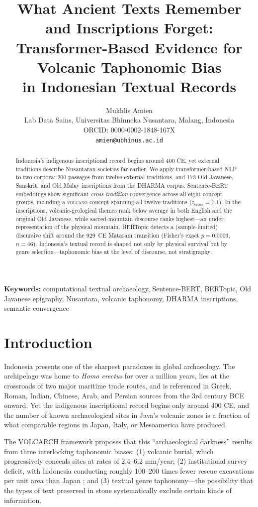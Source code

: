 \documentclass[12pt]{article}
\title{What Ancient Texts Remember and Inscriptions Forget:\\
Transformer-Based Evidence for Volcanic Taphonomic Bias\\in Indonesian Textual Records}
\author{Mukhlis Amien\\
\small Lab Data Sains, Universitas Bhinneka Nusantara, Malang, Indonesia\\
\small ORCID: 0000-0002-1848-167X\\
\small \texttt{amien@ubhinus.ac.id}}
\date{}
\begin{document}
\maketitle

\begin{abstract}
Indonesia's indigenous inscriptional record begins around 400 CE, yet external traditions describe Nusantaran societies far earlier. We apply transformer-based NLP to two corpora: 200 passages from twelve external traditions, and 173 Old Javanese, Sanskrit, and Old Malay inscriptions from the DHARMA corpus. Sentence-BERT embeddings show significant \emph{cross-tradition} convergence across all eight concept groups, including a \textsc{volcano} concept spanning all twelve traditions ($z_\mathrm{cross} = 7.1$). In the inscriptions, volcanic-geological themes rank below average in both English and the original Old Javanese, while sacred-mountain discourse ranks highest---an under-representation of the physical mountain. BERTopic detects a (sample-limited) discursive shift around the 929~CE Mataram transition (Fisher's exact $p = 0.0003$, $n = 46$). Indonesia's textual record is shaped not only by physical survival but by genre selection---taphonomic bias at the level of discourse, not stratigraphy.
\end{abstract}

\noindent\textbf{Keywords:} computational textual archaeology, Sentence-BERT, BERTopic, Old Javanese epigraphy, Nusantara, volcanic taphonomy, DHARMA inscriptions, semantic convergence

\section{Introduction}

Indonesia presents one of the sharpest paradoxes in global archaeology.
The archipelago was home to \textit{Homo erectus} for over a million years, lies at the crossroads of two major maritime trade routes, and is referenced in Greek, Roman, Indian, Chinese, Arab, and Persian sources from the 3rd century BCE onward.
Yet the indigenous inscriptional record begins only around 400 CE, and the number of known archaeological sites in Java's volcanic zones is a fraction of what comparable regions in Japan, Italy, or Mesoamerica have produced.

The VOLCARCH framework \citep[submitted]{Amien2026a} proposes that this ``archaeological darkness'' results from three interlocking taphonomic biases: (1) volcanic burial, which progressively conceals sites at rates of 2.4--6.2 mm/year; (2) institutional survey deficit, with Indonesia conducting roughly 100--200 times fewer rescue excavations per unit area than Japan \citep[submitted]{Amien2026a}; and (3) textual genre taphonomy---the possibility that the types of text preserved in stone systematically exclude certain kinds of information.
\end{document}
